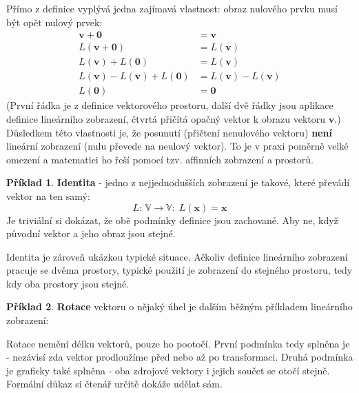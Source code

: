 \documentclass[a5paper,12pt]{amsbook}
\theoremstyle{definition}
\newtheorem{example}{Příklad}[chapter]
\newcommand{\myvec}[1]{\bm{#1}}
\newcommand{\myspace}[1]{\mathbb{#1}}
\newcommand{\mymap}[1]{#1}
\begin{document}
\noindent Přímo z definice vyplývá jedna zajímavá vlastnost: obraz nulového prvku musí být opět
nulový prvek:
\begin{align*}
\myvec{v} + \myvec{0} &= \myvec{v} \\
\mymap{L}(\myvec{v} + \myvec{0}) &= \mymap{L}(\myvec{v}) \\
\mymap{L}(\myvec{v}) + \mymap{L}(\myvec{0}) &= \mymap{L}(\myvec{v}) \\
\mymap{L}(\myvec{v}) - \mymap{L}(\myvec{v}) + \mymap{L}(\myvec{0}) 
    &= \mymap{L}(\myvec{v}) - \mymap{L}(\myvec{v}) \\
\mymap{L}(\myvec{0}) &= \myvec{0}
\end{align*}
(První řádka je z definice vektorového prostoru, další dvě řádky jsou aplikace definice
lineárního zobrazení, čtvrtá přičítá opačný vektor k obrazu vektoru $\myvec{v}$.) Důsledkem
této vlastnosti je, že posunutí (přičtení nenulového vektoru) \textbf{není} lineární zobrazení
(nulu převede na neulový vektor). To je v praxi poměrně velké omezení a matematici ho řeší
pomocí tzv. affinních zobrazení a prostorů.

\begin{example}\textbf{Identita} - jedno z nejjednodušších zobrazení je takové, které převádí vektor
na ten samý:
\begin{equation*}
\mymap{L}:\,\myspace{V}\rightarrow\myspace{V}:\;\mymap{L}(\myvec{x})=\myvec{x}
\end{equation*} 
Je triviální si dokázat, že obě podmínky definice jsou zachované. Aby ne, když původní vektor
a jeho obraz jsou stejné.

Identita je zároveň ukázkou typické situace. Ačkoliv definice lineárního zobrazení pracuje se dvěma
prostory, typické použití je zobrazení do stejného prostoru, tedy kdy oba prostory jsou stejné.

\end{example}

\begin{example}\label{example:rotate}\textbf{Rotace} vektoru o nějaký úhel je dalším běžným příkladem
lineárního zobrazení:
\begin{center}

\end{center}
Rotace nemění délku vektorů, pouze ho pootočí. První podmínka tedy splněna je - nezávisí zda
vektor prodloužíme před nebo až po transformaci. Druhá podmínka je graficky také splněna - oba zdrojové
vektory i jejich součet se otočí stejně. Formální důkaz si čtenář určitě dokáže udělat sám.

\end{example}
\end{document}
